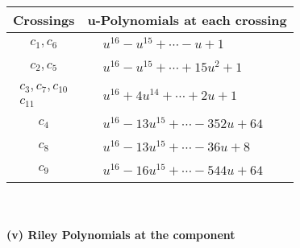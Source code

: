 \documentclass[1p]{elsarticle_modified}
\theoremstyle{definition}
\begin{document}
\begin{tabular}{m{50pt}|m{274pt}}
Crossings & \hspace{64pt}u-Polynomials at each crossing \\
\hline $$\begin{aligned}c_{1},c_{6}\end{aligned}$$&$\begin{aligned}
&u^{16}- u^{15}+\cdots- u+1
\end{aligned}$\\
\hline $$\begin{aligned}c_{2},c_{5}\end{aligned}$$&$\begin{aligned}
&u^{16}- u^{15}+\cdots+15 u^2+1
\end{aligned}$\\
\hline $$\begin{aligned}c_{3},c_{7},c_{10}\\c_{11}\end{aligned}$$&$\begin{aligned}
&u^{16}+4 u^{14}+\cdots+2 u+1
\end{aligned}$\\
\hline $$\begin{aligned}c_{4}\end{aligned}$$&$\begin{aligned}
&u^{16}-13 u^{15}+\cdots-352 u+64
\end{aligned}$\\
\hline $$\begin{aligned}c_{8}\end{aligned}$$&$\begin{aligned}
&u^{16}-13 u^{15}+\cdots-36 u+8
\end{aligned}$\\
\hline $$\begin{aligned}c_{9}\end{aligned}$$&$\begin{aligned}
&u^{16}-16 u^{15}+\cdots-544 u+64
\end{aligned}$\\
\hline
\end{tabular}\\~\\
\newpage\renewcommand{\arraystretch}{1}
\flushleft \textbf{(v) Riley Polynomials at the component}\newline \\
\end{document}
